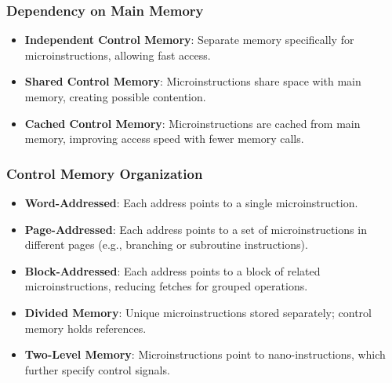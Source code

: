 

\begin{frame}
    \frametitle{Dependency on Main Memory}
    \begin{itemize}
        \item \textbf{Independent Control Memory}: Separate memory specifically for microinstructions, allowing fast access.
        \item \textbf{Shared Control Memory}: Microinstructions share space with main memory, creating possible contention.
        \item \textbf{Cached Control Memory}: Microinstructions are cached from main memory, improving access speed with fewer memory calls.
    \end{itemize}
\end{frame}

\begin{frame}
    \frametitle{Control Memory Organization}
    \begin{itemize}
        \item \textbf{Word-Addressed}: Each address points to a single microinstruction.
        \item \textbf{Page-Addressed}: Each address points to a set of microinstructions in different pages (e.g., branching or subroutine instructions).
        \item \textbf{Block-Addressed}: Each address points to a block of related microinstructions, reducing fetches for grouped operations.
        \item \textbf{Divided Memory}: Unique microinstructions stored separately; control memory holds references.
        \item \textbf{Two-Level Memory}: Microinstructions point to nano-instructions, which further specify control signals.
    \end{itemize}
\end{frame}

